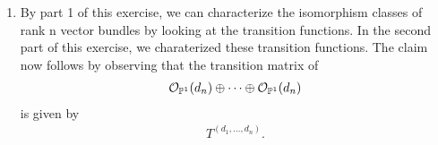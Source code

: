 \newcommand{\sheet}{8}




\maketitle{}

\begin{exercise}{3}
    \begin{enumerate}
        \item By part 1 of this exercise, we can characterize the isomorphism classes of rank n vector bundles by looking at the transition functions. 
        In the second part of this exercise, we charaterized these transition functions. The claim now follows by observing that the transition matrix of 
        \begin{align*}
            \mathcal{O}_{\mathbb{P}^1}(d_n)\oplus \dots \oplus \mathcal{O}_{\mathbb{P} ^1}(d_n)
        \end{align*}
        is given by
        \begin{align*}
            T^{(d_1,\dots, d_n)}.
        \end{align*}
    \end{enumerate}
\end{exercise}


